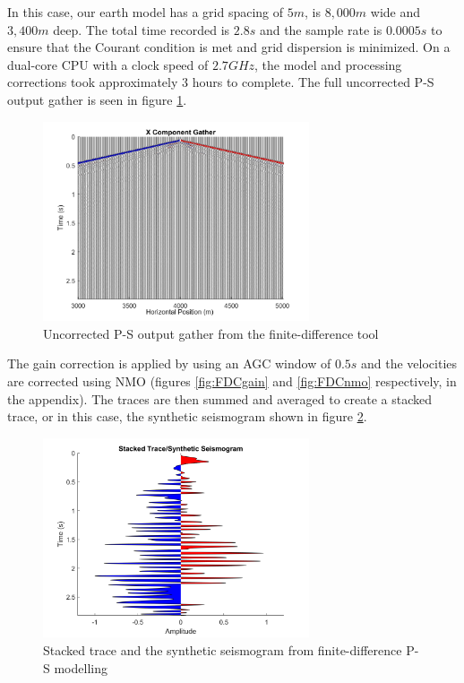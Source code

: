 \documentclass[12pt]{article}
\begin{document}
	In this case, our earth model has a grid spacing of $5m$, is $8,000m$ wide and $3,400m$ deep. The total time recorded is $2.8s$ and the sample rate is $0.0005s$ to ensure that the Courant condition is met and grid dispersion is minimized. On a dual-core CPU with a clock speed of $2.7 GHz$, the model and processing corrections took approximately 3 hours to complete.  The full uncorrected P-S output gather is seen in figure \ref{fig:FDCXgather}.

\begin{figure}[!htb]
	\centering
	\includegraphics[width=0.7\textwidth]{Figures/FDCXgather.png}
	\caption[Fox Creek finite-difference P-S gather]{Uncorrected P-S output gather from the finite-difference tool}
	\label{fig:FDCXgather}
\end{figure}	
	
	The gain correction is applied by using an AGC window of $0.5s$ and the velocities are corrected using NMO (figures \ref{fig:FDCgain} and \ref{fig:FDCnmo} respectively, in the appendix). The traces are then summed and averaged to create a stacked trace, or in this case, the synthetic seismogram shown in figure \ref{fig:FDCstack}.
	
\begin{figure}[!htb]
	\centering
	\includegraphics[width=0.7\textwidth]{Figures/FDCstack.png}
	\caption[Fox Creek finite-difference P-S synthetic seismogram]{Stacked trace and the synthetic seismogram from finite-difference P-S modelling}
	\label{fig:FDCstack}
\end{figure}	
	
\end{document}
